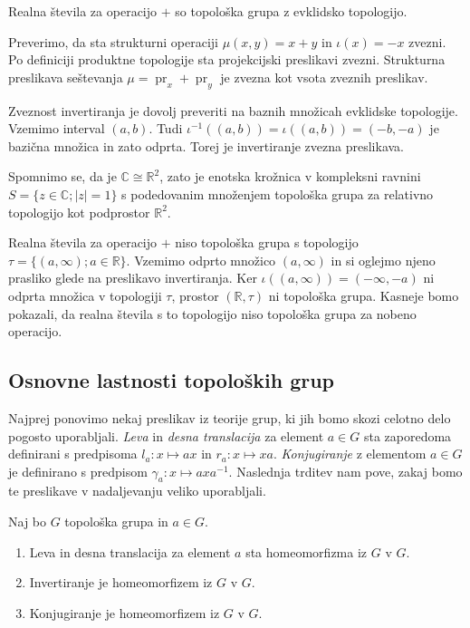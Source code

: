 \documentclass[mat1]{fmfdelo}
\newcommand{\R}{\mathbb R}
\newcommand{\C}{\mathbb C}
\DeclareMathOperator{\pr}{pr}
\begin{document}
\begin{primer}
	Realna števila za operacijo $+$ so topološka grupa z evklidsko topologijo.
	
	Preverimo, da sta strukturni operaciji $\mu(x, y) = x + y$ in $\iota(x) = -x$ zvezni.
	Po definiciji produktne topologije sta projekcijski preslikavi zvezni. Strukturna preslikava seštevanja $\mu = \pr_x + \pr_y$ je zvezna kot vsota zveznih preslikav.
	
	Zveznost invertiranja je dovolj preveriti na baznih množicah evklidske topologije. Vzemimo interval $(a, b)$. Tudi $\iota^{-1}((a, b)) = \iota((a, b)) = (-b, -a)$ je bazična množica in zato odprta. Torej je invertiranje zvezna preslikava.
\end{primer}

\begin{primer}
	Spomnimo se, da je $\C \cong \R^2$, zato je
	enotska krožnica v kompleksni ravnini $S = \lbrace z \in \C ; |z| = 1 \rbrace$ s podedovanim množenjem topološka grupa za relativno topologijo kot podprostor $\R^2$.
\end{primer}

\begin{primer}\label{pri:haus}
	Realna števila za operacijo $+$ niso topološka grupa s topologijo $\tau = \lbrace (a, \infty) ; a \in \R \rbrace$. Vzemimo odprto množico $(a, \infty)$ in si oglejmo njeno prasliko glede na preslikavo invertiranja. Ker $\iota((a, \infty)) = (-\infty, -a)$ ni odprta množica v topologiji $\tau$, prostor $(\R, \tau)$ ni topološka grupa. Kasneje bomo pokazali, da realna števila s to topologijo niso topološka grupa za nobeno operacijo.
\end{primer}

\subsection{Osnovne lastnosti topoloških grup}
Najprej ponovimo nekaj preslikav iz teorije grup, ki jih bomo skozi celotno delo pogosto uporabljali. \emph{Leva} in \emph{desna translacija} za element $a \in G$ sta zaporedoma definirani s predpisoma $l_a\colon x \mapsto ax$ in $r_a\colon x \mapsto xa$. \emph{Konjugiranje} z elementom $a \in G$ je definirano s predpisom $\gamma_a\colon x \mapsto axa^{-1}$. Naslednja trditev nam pove, zakaj bomo te preslikave v nadaljevanju veliko uporabljali.

\begin{trditev}\label{trd:trans}
Naj bo $G$ topološka grupa in $a \in G$.
\begin{enumerate}
\item Leva in desna translacija za element $a$ sta homeomorfizma iz $G$ v $G$.\label{podtrd:ldt}
\item Invertiranje je homeomorfizem iz $G$ v $G$.
\item Konjugiranje je homeomorfizem iz $G$ v $G$.
\end{enumerate}
\end{trditev}
\end{document}
